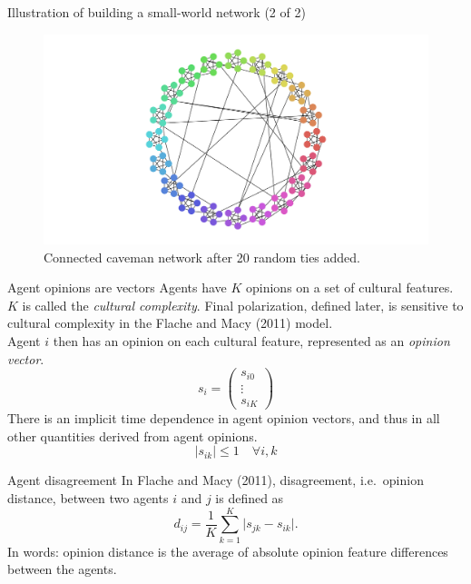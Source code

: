 \documentclass[11pt]{beamer}
\begin{document}
  \begin{frame}{Illustration of building a small-world network (2 of 2)}
  \begin{figure}[t!]
            \centering
            \includegraphics[width=\textwidth]{Figures/n=20-k=5-20random.pdf}
            \caption{Connected caveman network after 20 random ties added.}
    \end{figure}
\end{frame}

\begin{frame}{Agent opinions are vectors}
  Agents have $K$ opinions on a set of cultural features. $K$ is called the
  \emph{cultural complexity}. Final polarization, defined later, is 
  sensitive to cultural complexity in the Flache and Macy (2011) model. 
  \\[1em]
  Agent $i$ then has an opinion on each cultural feature, represented as an
  \emph{opinion vector}.
  \[
    s_i = \begin{pmatrix}
      s_{i0} \\
      \vdots \\
      s_{iK}
    \end{pmatrix}
  \]
  There is an implicit time dependence in agent opinion vectors, and thus
  in all other quantities derived from agent opinions.
  \\[1em]
  \[
    |s_{ik}| \leq 1 \quad \forall i, k
  \]
\end{frame}

\begin{frame}{Agent disagreement}
  In Flache and Macy (2011), disagreement, i.e.\ opinion distance, between two
  agents $i$ and $j$ is defined as
  \[
    d_{ij} = \frac{1}{K} \sum_{k=1}^K \lvert s_{jk} - s_{ik} \rvert.
  \]
  In words: opinion distance is the average of absolute opinion feature
  differences between the agents.
\end{frame}
\end{document}
